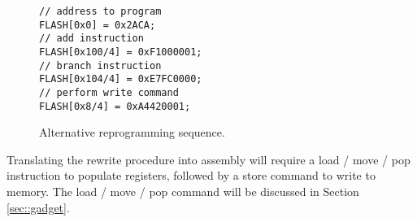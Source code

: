 	\begin{figure}[htbp]
		\begin{lstlisting}
// address to program
FLASH[0x0] = 0x2ACA; 
// add instruction
FLASH[0x100/4] = 0xF1000001;
// branch instruction
FLASH[0x104/4] = 0xE7FC0000;
// perform write command
FLASH[0x8/4] = 0xA4420001; 
		\end{lstlisting}
		\caption{Alternative reprogramming sequence. }\label{fig::alt_prog}
	\end{figure}

Translating the rewrite procedure into assembly will require a load / move / pop instruction to populate registers, followed by a store command to write to memory. The load / move / pop command will be discussed in Section \ref{sec::gadget}. 


